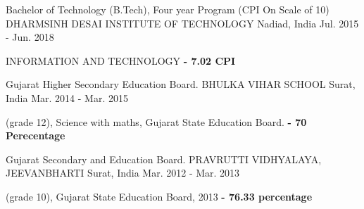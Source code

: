 \begin{cventries}
  \cventry
    {Bachelor of Technology (B.Tech), Four year Program (CPI On Scale of 10)}
    {DHARMSINH DESAI INSTITUTE OF TECHNOLOGY}
    {Nadiad, India}
    {Jul. 2015 - Jun. 2018}
    {
      \begin{cvitems}
      	\item
        	{INFORMATION AND TECHNOLOGY}
    		\textbf{{- 7.02 CPI}}
            \end{cvitems}
    }
    \end{cventries}
    \vspace{-5mm}
    \begin{cventries}
  \cventry
    {Gujarat Higher Secondary Education Board.}
    {BHULKA VIHAR SCHOOL}
    {Surat, India}
    {Mar. 2014 - Mar. 2015}
    {
      \begin{cvitems}
      	\item
        	{ (grade 12), Science with maths, Gujarat State Education Board.}
        	\textbf{{- 70 Perecentage}}
      \end{cvitems}
    }
\end{cventries}
\vspace{-5mm}
\begin{cventries}
  \cventry
    {Gujarat Secondary and Education Board.}
    {PRAVRUTTI VIDHYALAYA, JEEVANBHARTI}
    {Surat, India}
    {Mar. 2012 - Mar. 2013}
    {
      \begin{cvitems}
      	\item
        	{(grade 10), Gujarat State Education Board, 2013}
        	\textbf{{- 76.33 percentage}}
      \end{cvitems}
    }
\end{cventries}
